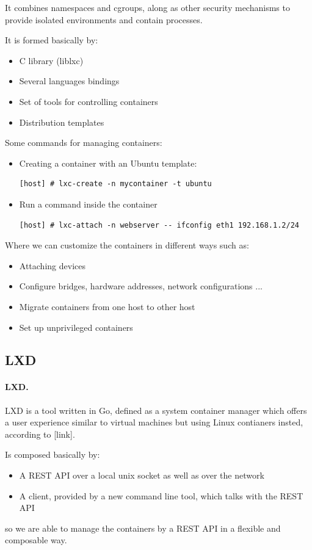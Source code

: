 It combines namespaces and cgroups, along as other security mechanisms to provide isolated environments and contain processes.

It is formed basically by:
\begin{itemize}
	\item{C library (liblxc)}
	\item{Several languages bindings}
	\item{Set of tools for controlling containers}
	\item{Distribution templates}
\end{itemize}

Some commands for managing containers:
\begin{itemize}
	\item{Creating a container with an Ubuntu template}:
	      \begin{verbatim}
[host] # lxc-create -n mycontainer -t ubuntu
	\end{verbatim}
	\item{Run a command inside the container}
	      \begin{verbatim}
[host] # lxc-attach -n webserver -- ifconfig eth1 192.168.1.2/24
	\end{verbatim}
\end{itemize}

Where we can customize the containers in different ways such as:
\begin{itemize}
	\item{Attaching devices}
	\item{Configure bridges, hardware addresses, network configurations ...}
	\item{Migrate containers from one host to other host}
	\item{Set up unprivileged containers}
\end{itemize}

\subsection{LXD}
\paragraph{LXD.} LXD is a tool written in Go, defined as a system container manager which offers a user experience similar to virtual machines but using Linux contianers insted, according to [link].

Is composed basically by:
\begin{itemize}
	\item{A REST API over a local unix socket as well as over the network}
	\item{A client, provided by a new command line tool, which talks with the REST API}
\end{itemize}
so we are able to manage the containers by a REST API in a flexible and composable way.

